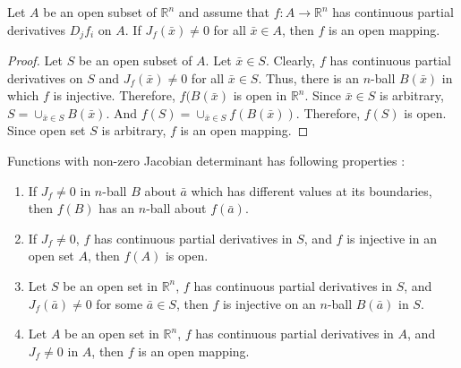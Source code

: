 \begin{theorem}
Let $A$ be an open subset of $\mathbb{R}^n$ and assume that $f : A \to \mathbb{R}^n$ has continuous partial derivatives $D_jf_i$ on $A$.
If $J_f(\bar{x}) \ne 0$ for all $\bar{x} \in A$, then $f$ is an open mapping.
\end{theorem}
\begin{proof}
Let $S$ be an open subset of $A$.
Let $\bar{x} \in S$.
Clearly, $f$ has continuous partial derivatives on $S$ and $J_f(\bar{x}) \ne 0$ for all $\bar{x} \in S$.
Thus, there is an $n$-ball $B(\bar{x})$ in which $f$ is injective.
Therefore, $f(B(\bar{x})$ is open in $\mathbb{R}^n$.
Since $\bar{x} \in S$ is arbitrary, $S = \cup_{\bar{x} \in S} B(\bar{x})$.
And $f(S) = \cup_{\bar{x} \in S} f(B(\bar{x}))$.
Therefore, $f(S)$ is open.
Since open set $S$ is arbitrary, $f$ is an open mapping.
\end{proof}

\begin{commentary}
\begin{remark}[Properties]
Functions with non-zero Jacobian determinant has following properties :
\begin{enumerate}
	\item If $J_f \ne 0$ in $n$-ball $B$ about $\bar{a}$ which has different values at its boundaries, then $f(B)$ has an $n$-ball about $f(\bar{a})$.
	\item If $J_f \ne 0$, $f$ has continuous partial derivatives in $S$, and $f$ is injective in an open set $A$, then $f(A)$ is open.
	\item Let $S$ be an open set in $\mathbb{R}^n$, $f$ has continuous partial derivatives in $S$, and $J_f(\bar{a}) \ne 0$ for some $\bar{a} \in S$, then $f$ is injective on an $n$-ball $B(\bar{a})$ in $S$.
	\item Let $A$ be an open set in $\mathbb{R}^n$, $f$ has continuous partial derivatives in $A$, and $J_f \ne 0$ in $A$, then $f$ is an open mapping.
\end{enumerate}
\end{remark}
\end{commentary}

